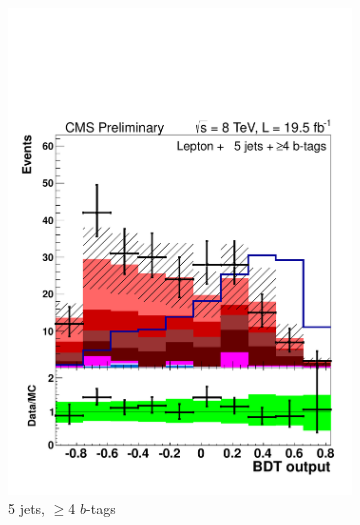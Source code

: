\begin{figure}[hbtp]
\begin{subfigure}[hbtp]{0.31\textwidth}
     \includegraphics[width=\textwidth]{Figures/Analysis_2_Diagrams/LJ_plots_lep/5j4t/lep_disc_final10v16_8TeV_CFMlpANN_BDT_5j4t_cumulative_wRatio_noLegend_lin.pdf}
     \caption{5 jets, $\ge$4 $b$-tags}\label{lj_BDToutput_8TeV_4}
   \end{subfigure}
   ~ %
   \begin{subfigure}[hbtp]{0.31\textwidth}

\end{subfigure}
\end{figure}
